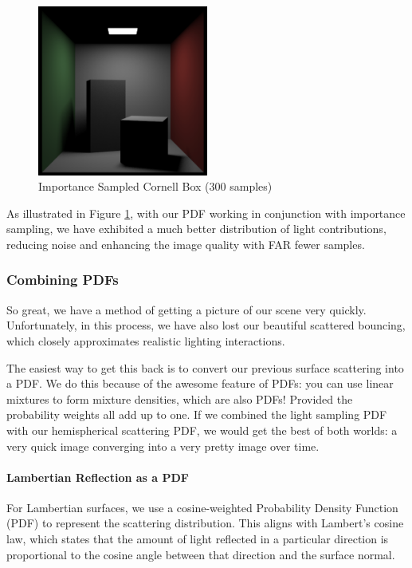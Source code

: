 \documentclass[12pt]{article}
\begin{document}
\begin{figure}[H]
    \centering
    \includegraphics[width=0.5\textwidth]{images/importance_sampled.png}
    \caption{Importance Sampled Cornell Box (300 samples)}
    \label{fig:importancesampled}
\end{figure}
As illustrated in Figure \ref{fig:importancesampled}, with our PDF working in conjunction with importance sampling, we have exhibited a much better distribution of light contributions, reducing noise and enhancing the image quality with FAR fewer samples.

\subsubsection{Combining PDFs}

So great, we have a method of getting a picture of our scene very quickly. Unfortunately, in this process, we have also lost our beautiful scattered bouncing, which closely approximates realistic lighting interactions.

The easiest way to get this back is to convert our previous surface scattering into a PDF. We do this because of the awesome feature of PDFs: you can use linear mixtures to form mixture densities, which are also PDFs! Provided the probability weights all add up to one. If we combined the light sampling PDF with our hemispherical scattering PDF, we would get the best of both worlds: a very quick image converging into a very pretty image over time.


\paragraph{Lambertian Reflection as a PDF}

For Lambertian surfaces, we use a cosine-weighted Probability Density Function (PDF) to represent the scattering distribution. This aligns with Lambert's cosine law, which states that the amount of light reflected in a particular direction is proportional to the cosine angle between that direction and the surface normal.
\end{document}
